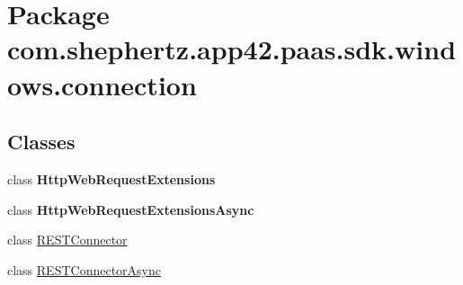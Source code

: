\hypertarget{namespacecom_1_1shephertz_1_1app42_1_1paas_1_1sdk_1_1windows_1_1connection}{\section{Package com.\+shephertz.\+app42.\+paas.\+sdk.\+windows.\+connection}
\label{namespacecom_1_1shephertz_1_1app42_1_1paas_1_1sdk_1_1windows_1_1connection}
}
\subsection*{Classes}
\begin{DoxyCompactItemize}
\item 
class {\bfseries Http\+Web\+Request\+Extensions}
\item 
class {\bfseries Http\+Web\+Request\+Extensions\+Async}
\item 
class \hyperlink{classcom_1_1shephertz_1_1app42_1_1paas_1_1sdk_1_1windows_1_1connection_1_1_r_e_s_t_connector}{R\+E\+S\+T\+Connector}
\item 
class \hyperlink{classcom_1_1shephertz_1_1app42_1_1paas_1_1sdk_1_1windows_1_1connection_1_1_r_e_s_t_connector_async}{R\+E\+S\+T\+Connector\+Async}
\end{DoxyCompactItemize}
